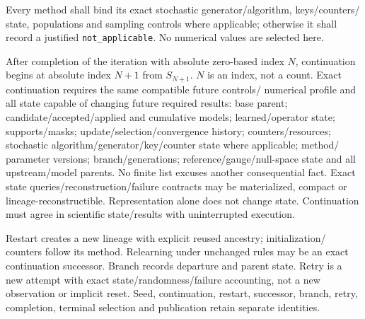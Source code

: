 {{Every method shall bind its exact stochastic generator/algorithm, keys/counters/
state, populations and sampling controls where applicable; otherwise it shall
record a justified \texttt{not\_applicable}. No numerical values are selected here.

After completion of the iteration with absolute zero-based index $N$,
continuation begins at absolute index $N+1$ from $S_{N+1}$. $N$ is an index,
not a count. Exact continuation requires the same compatible future controls/
numerical profile and all state capable of changing future required results:
base parent; candidate/accepted/applied and cumulative models; learned/operator
state; supports/masks; update/selection/convergence history; counters/resources;
stochastic algorithm/generator/key/counter state where applicable; method/
parameter versions; branch/generations; reference/gauge/null-space state and
all upstream/model parents. No finite list excuses another consequential fact.
Exact state queries/reconstruction/failure contracts may be materialized,
compact or lineage-reconstructible. Representation alone does not change state.
Continuation must agree in scientific state/results with uninterrupted execution.

Restart creates a new lineage with explicit reused ancestry; initialization/
counters follow its method. Relearning under unchanged rules may be an exact
continuation successor. Branch records departure and parent state. Retry is a
new attempt with exact state/randomness/failure accounting, not a new observation
or implicit reset. Seed, continuation, restart, successor, branch, retry,
completion, terminal selection and publication retain separate identities.
}}
